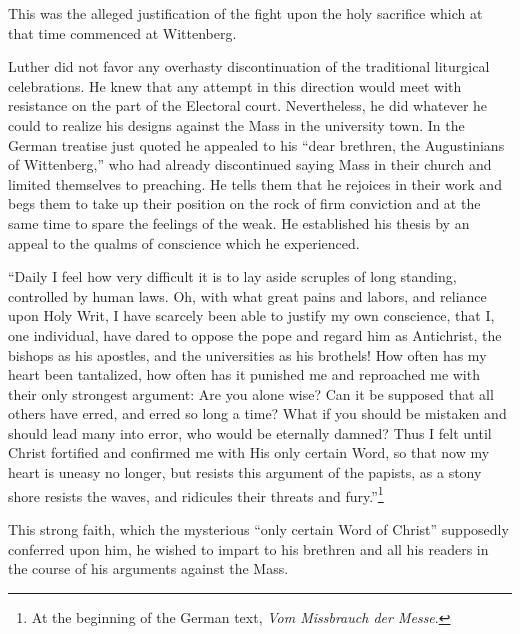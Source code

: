 This was the alleged justification of the fight upon the holy sacrifice
which at that time commenced at Wittenberg.

Luther did not favor any overhasty discontinuation of the traditional liturgical
celebrations. He knew that any attempt in this direction would meet with
resistance on the part of the Electoral court.
Nevertheless, he did whatever he could to realize his designs against
the Mass in the university town. In the German treatise just quoted
he appealed to his “dear brethren, the Augustinians of Wittenberg,”
who had already discontinued saying Mass in their church and limited
themselves to preaching. He tells them that he rejoices in their work
and begs them to take up their position on the rock of firm conviction
and at the same time to spare the feelings of the weak. He established
his thesis by an appeal to the qualms of conscience which he experienced.

“Daily I feel how very difficult it is to lay aside scruples of long standing,
controlled by human laws. Oh, with what great pains and labors, and reliance
upon Holy Writ, I have scarcely been able to justify my own conscience,
that I, one individual, have dared to oppose the pope and regard him as
Antichrist, the bishops as his apostles, and the universities as his brothels! How
often has my heart been tantalized, how often has it punished me and reproached
me with their only strongest argument: Are you alone wise? Can it
be supposed that all others have erred, and erred so long a time? What if
you should be mistaken and should lead many into error, who would be
eternally damned? Thus I felt until Christ fortified and confirmed me with
His only certain Word, so that now my heart is uneasy no longer, but resists
this argument of the papists, as a stony shore resists the waves, and
ridicules their threats and fury.”\footnote{At the beginning of the German text, \textit{Vom Missbrauch der Messe}.}

This strong faith, which the mysterious “only certain Word of
Christ” supposedly conferred upon him, he wished to impart to his
brethren and all his readers in the course of his arguments against the
Mass.
